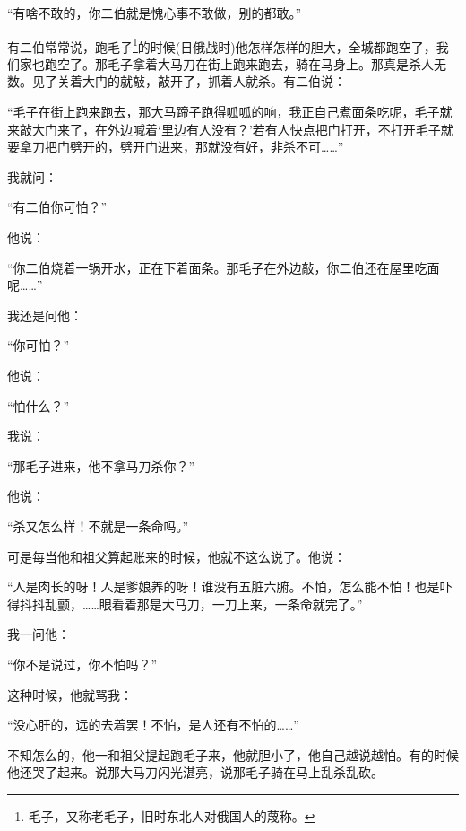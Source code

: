 \par “有啥不敢的，你二伯就是愧心事不敢做，别的都敢。”
\par 有二伯常常说，跑毛子\footnote{毛子，又称老毛子，旧时东北人对俄国人的蔑称。}的时候(日俄战时)他怎样怎样的胆大，全城都跑空了，我们家也跑空了。那毛子拿着大马刀在街上跑来跑去，骑在马身上。那真是杀人无数。见了关着大门的就敲，敲开了，抓着人就杀。有二伯说：
\par “毛子在街上跑来跑去，那大马蹄子跑得呱呱的响，我正自己煮面条吃呢，毛子就来敲大门来了，在外边喊着‘里边有人没有？’若有人快点把门打开，不打开毛子就要拿刀把门劈开的，劈开门进来，那就没有好，非杀不可……”
\par 我就问：
\par “有二伯你可怕？”
\par 他说：
\par “你二伯烧着一锅开水，正在下着面条。那毛子在外边敲，你二伯还在屋里吃面呢……”
\par 我还是问他：
\par “你可怕？”
\par 他说：
\par “怕什么？”
\par 我说：
\par “那毛子进来，他不拿马刀杀你？”
\par 他说：
\par “杀又怎么样！不就是一条命吗。”
\par 可是每当他和祖父算起账来的时候，他就不这么说了。他说：
\par “人是肉长的呀！人是爹娘养的呀！谁没有五脏六腑。不怕，怎么能不怕！也是吓得抖抖乱颤，……眼看着那是大马刀，一刀上来，一条命就完了。”
\par 我一问他：
\par “你不是说过，你不怕吗？”
\par 这种时候，他就骂我：
\par “没心肝的，远的去着罢！不怕，是人还有不怕的……”
\par 不知怎么的，他一和祖父提起跑毛子来，他就胆小了，他自己越说越怕。有的时候他还哭了起来。说那大马刀闪光湛亮，说那毛子骑在马上乱杀乱砍。
